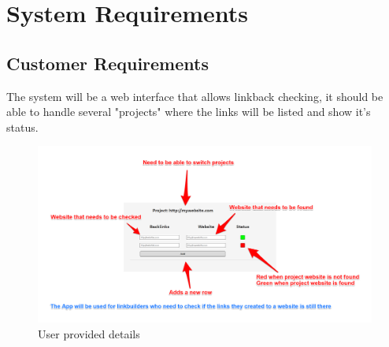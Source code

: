 \section{System Requirements}

\subsection{Customer Requirements}
The system will be a web interface that allows linkback checking, it should be able to handle several "projects" where the links will be listed and show it's status.

\begin{figure}[ht!]
	\includegraphics[width=\textwidth]{images/backlinkappfiverrexplained}
	\caption{User provided details}
\end{figure}

